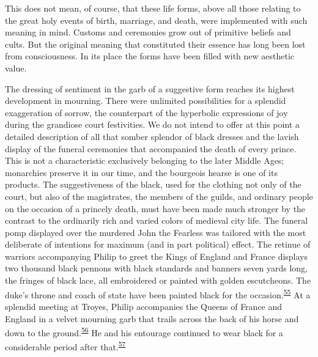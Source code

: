 This does not mean, of course, that these life forms, above all those
relating to the great holy events of birth, marriage, and death, were
implemented with such meaning in mind. Customs and ceremonies grow out
of primitive beliefs and cults. But the original meaning that
constituted their essence has long been lost from consciousness. In its
place the forms have been filled with new aesthetic value.

The dressing of sentiment in the garb of a suggestive form reaches its
highest development in mourning. There were unlimited possibilities for
a splendid exaggeration of sorrow, the counterpart of the hyperbolic
expressions of joy during the grandiose court festivities. We do not
intend to offer at this point a detailed description of all that somber
splendor of black dresses and the lavish display of the funeral
ceremonies that accompanied the death of every prince. This is not a
characteristic exclusively belonging to the later Middle Ages;
monarchies preserve it in our time, and the bourgeois hearse is one of
its products. The suggestiveness of the black, used for the clothing not
only of the court, but also of the magistrates, the members of the
guilds, and ordinary people on the occasion of a princely death, must
have been made much stronger by the contrast to the ordinarily rich and
varied colors of medieval city life. The funeral pomp displayed over the
murdered
\protect\hypertarget{09_Chapter_Two__THE_CRAVING_FOR_A_M.xhtmlux5cux23page_54}{}{}John
the Fearless was tailored with the most deliberate of intentions for
maximum (and in part political) effect. The retinue of warriors
accompanying Philip to greet the Kings of England and France displays
two thousand black pennons with black standards and banners seven yards
long, the fringes of black lace, all embroidered or painted with golden
escutcheons. The duke's throne and coach of state have been painted
black for the
occasion.\textsuperscript{\protect\hypertarget{09_Chapter_Two__THE_CRAVING_FOR_A_M.xhtmlux5cux23id_1978}{\protect\hyperlink{23_NOTES.xhtmlux5cux23id_1979}{55}}}
At a splendid meeting at Troyes, Philip accompanies the Queens of France
and England in a velvet mourning garb that trails across the back of his
horse and down to the
ground.\textsuperscript{\protect\hypertarget{09_Chapter_Two__THE_CRAVING_FOR_A_M.xhtmlux5cux23id_1976}{\protect\hyperlink{23_NOTES.xhtmlux5cux23id_1977}{56}}}
He and his entourage continued to wear black for a considerable period
after
that.\textsuperscript{\protect\hypertarget{09_Chapter_Two__THE_CRAVING_FOR_A_M.xhtmlux5cux23id_1974}{\protect\hyperlink{23_NOTES.xhtmlux5cux23id_1975}{57}}}

